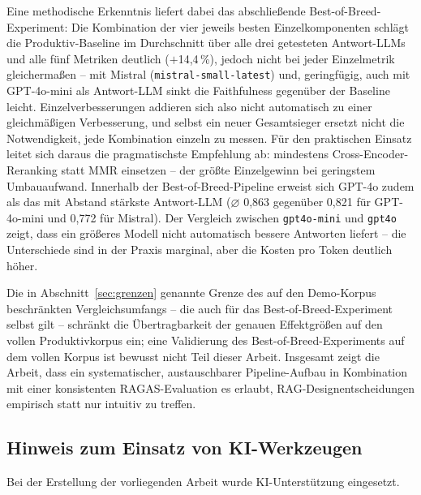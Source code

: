 \documentclass[11pt,a4paper]{article}
\begin{document}
Eine methodische Erkenntnis liefert dabei das abschließende
Best-of-Breed-Experiment: Die Kombination der vier jeweils besten
Einzelkomponenten schlägt die Produktiv-Baseline im Durchschnitt über alle
drei getesteten Antwort-LLMs und alle fünf Metriken deutlich
($+$14,4\,\%), jedoch nicht bei jeder Einzelmetrik gleichermaßen -- mit
Mistral (\texttt{mistral-small-latest}) und, geringfügig, auch mit GPT-4o-mini als Antwort-LLM sinkt die
Faithfulness gegenüber der Baseline leicht. Einzelverbesserungen addieren
sich also nicht automatisch zu einer gleichmäßigen Verbesserung, und selbst
ein neuer Gesamtsieger ersetzt nicht die Notwendigkeit, jede Kombination
einzeln zu messen. Für den praktischen Einsatz leitet sich daraus die
pragmatischste Empfehlung ab: mindestens Cross-Encoder-Reranking statt MMR
einsetzen -- der größte Einzelgewinn bei geringstem Umbauaufwand.
Innerhalb der Best-of-Breed-Pipeline erweist sich GPT-4o zudem als das mit
Abstand stärkste Antwort-LLM ($\varnothing$ 0,863 gegenüber 0,821 für
GPT-4o-mini und 0,772 für Mistral). Der Vergleich zwischen \texttt{gpt4o-mini} und \texttt{gpt4o} zeigt, dass ein größeres Modell nicht automatisch bessere Antworten liefert -- die Unterschiede sind in der Praxis marginal, aber die Kosten pro Token deutlich höher. 

Die in Abschnitt~\ref{sec:grenzen} genannte Grenze des auf den Demo-Korpus
beschränkten Vergleichsumfangs -- die auch für das Best-of-Breed-Experiment
selbst gilt -- schränkt die Übertragbarkeit der genauen Effektgrößen auf
den vollen Produktivkorpus ein; eine Validierung des Best-of-Breed-Experiments
auf dem vollen Korpus ist bewusst nicht Teil dieser Arbeit. Insgesamt zeigt die
Arbeit, dass ein systematischer, austauschbarer Pipeline-Aufbau in
Kombination mit einer konsistenten RAGAS-Evaluation es erlaubt,
RAG-Designentscheidungen empirisch statt nur intuitiv zu treffen.

\subsection{Hinweis zum Einsatz von KI-Werkzeugen}

Bei der Erstellung der vorliegenden Arbeit wurde KI-Unterstützung eingesetzt.
\end{document}
